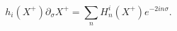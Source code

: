 \begin{equation}
 h_i (X^+) \partial_{\sigma} X^+ = \sum_{n} H^i_n (X^+) e^{-2 i n \sigma} .  
\end{equation}

